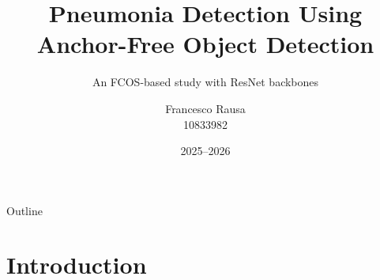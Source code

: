 \documentclass[aspectratio=169,11pt]{beamer}
\title{Pneumonia Detection Using\\
Anchor-Free Object Detection}
\subtitle{An FCOS-based study with ResNet backbones}
\author[Francesco Rausa]{Francesco Rausa \\ 10833982}\\
\institute[PoliMI]{
    Numerical Analysis for Machine Learning\\
    Politecnico di Milano
}
\date{2025--2026}
\begin{document}

\begin{frame}
    \titlepage
\end{frame}


\begin{frame}{Outline}
    \tableofcontents
\end{frame}


\section{Introduction}

\end{document}
